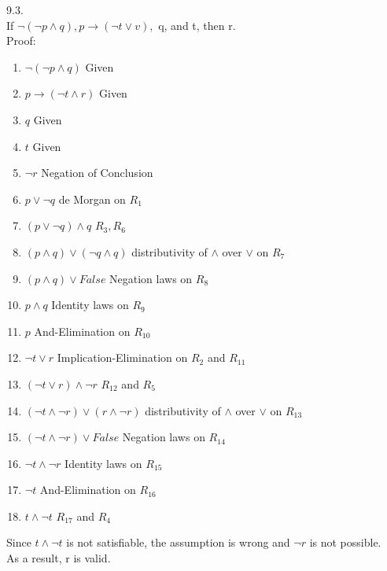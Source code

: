 \documentclass[a4paper]{article}
\begin{document}
9.3.\\
If $\neg (\neg p \wedge q), p\rightarrow (\neg t \vee v),$ q, and t, then r.\\
Proof:\\
\begin{enumerate}[1.]
\item $\neg (\neg p \wedge q)$ \hfill Given
\item $p \rightarrow (\neg t \wedge r)$ \hfill Given
\item $q$ \hfill Given
\item $t$ \hfill Given
\item $\neg r$ \hfill Negation of Conclusion
\item $p \vee \neg q$ \hfill de Morgan on $R_1$
\item $(p \vee \neg q) \wedge q$ \hfill $R_3, R_6$
\item $(p \wedge q) \vee (\neg q \wedge q)$ \hfill distributivity of $\wedge$ over $\vee$ on $R_7$
\item $(p \wedge q) \vee False$ \hfill Negation laws on $R_8$
\item $p \wedge q$ \hfill Identity laws on $R_9$
\item $p$ \hfill And-Elimination on $R_{10}$
\item $\neg t \vee r$ \hfill Implication-Elimination on $R_2$ and $R_{11}$
\item $(\neg t \vee r) \wedge \neg r$ \hfill $R_12$ and $R_5$
\item $(\neg t \wedge \neg r) \vee (r \wedge \neg r)$ \hfill distributivity of $\wedge$ over $\vee$ on $R_{13}$
\item $(\neg t \wedge \neg r) \vee False$ \hfill Negation laws on $R_{14}$
\item $\neg t \wedge \neg r$ \hfill  Identity laws on $R_{15}$
\item $\neg t$ \hfill And-Elimination on $R_{16}$
\item $t \wedge \neg t$ \hfill $R_{17}$ and $R_4$
\end{enumerate}
Since $t \wedge \neg t$ is not satisfiable, the assumption is wrong and $\neg r$ is not possible.\\
As a result, r is valid.
\end{document}
